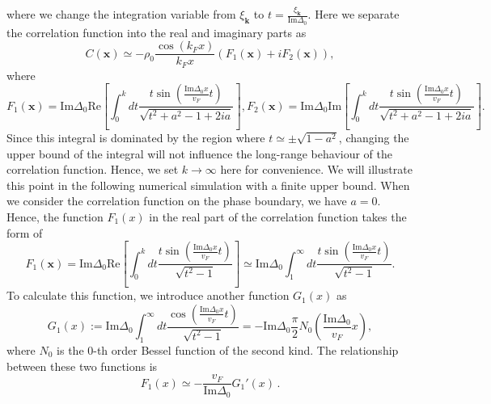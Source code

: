 \documentclass[aps,onecolumn,nofootinbib,superscriptaddress,notitlepage,longbibliography]{revtex4-1}
\begin{document}
where we change the integration variable from $\xi_{\bm{k}}$ to $t=\frac{\xi_{\bm{k}}}{\text{Im}\Delta_0} $. Here we separate the correlation function into the real and imaginary parts as 
\begin{equation}
	C(\bm{x})\simeq-\rho_0 \frac{\cos(k_F x)}{k_Fx}(F_1(\bm{x})+iF_2(\bm{x})),
\end{equation}
where
\begin{equation}
	F_1(\bm{x})=\text{Im}\Delta_0\text{Re}\left[\int_0^{k} dt \frac{t\sin ( \frac{\text{Im}\Delta_0x}{v_F}
	t )}{ \sqrt{t^2 +a^2- 1+2ia}}\right],F_2(\bm{x})=\text{Im}\Delta_0\text{Im}\left[\int_0^{k} dt \frac{t\sin ( \frac{\text{Im}\Delta_0x}{v_F}
	t )}{ \sqrt{t^2 +a^2- 1+2ia}}\right]\label{F_1F_2}.
\end{equation}
 Since this integral is dominated by the region where $t\simeq\pm\sqrt{1-a^2}$, changing the upper bound of the integral will not influence the long-range behaviour of the correlation function. Hence, we set $k\to\infty$ here for convenience. We will illustrate this point in the following numerical simulation with a finite upper bound.
 When we consider the correlation function on the phase boundary, we have $a=0$. Hence, the function $F_1(x)$ in the real part of the correlation function takes the form of
\begin{equation}
	F_1(\bm{x})=\text{Im}\Delta_0\text{Re}\left[\int_0^{k} dt \frac{t\sin ( \frac{\text{Im}\Delta_0x}{v_F}
	t )}{ \sqrt{t^2 - 1}}\right]\simeq\text{Im}\Delta_0\int_1^{\infty} dt \frac{t\sin ( \frac{\text{Im}\Delta_0x}{v_F}
	t )}{ \sqrt{t^2 - 1}}.
	\label{definition_of_F1}
\end{equation}
To calculate this function, we introduce another function $G_1(x)$ as
\begin{equation}
	G_1 (x) := \text{Im}
		\Delta_0\int_1^{\infty} dt \frac{\cos ( \frac{\text{Im}\Delta_0x}{v_F}
		t )}{ \sqrt{t^2 - 1}}=-\text{Im}\Delta_0\frac{\pi}{2} N_0 \left( \frac{\text{Im} \Delta_0}{v_F} x \right),
\end{equation}
where $N_0$ is the 0-th order Bessel function of the second kind. The relationship between these two functions is 
\begin{equation}
	F_1 (x) \simeq - \frac{v_F}{\text{Im}\Delta_0} G_1' (x)\,.
\end{equation}
\end{document}
